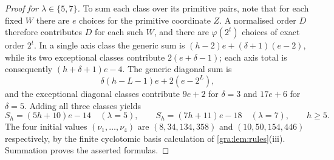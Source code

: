 \begin{proof}[Proof for $\lambda\in\{5,7\}$]
To sum each class over its primitive pairs, note that for each fixed $W$
there are $e$ choices for the primitive coordinate $Z$. A normalised order
$D$ therefore contributes $D$ for each such $W$, and there are
$\varphi(2^t)$ choices of exact order $2^t$. In a single axis class the
generic sum is $(h-2)e+(\delta+1)(e-2)$, while its two exceptional classes
contribute $2(e+\delta-1)$; each axis total is consequently
$(h+\delta+1)e-4$. The generic diagonal sum is
\[
 \delta(h-L-1)e+2(e-2^L),
\]
and the exceptional diagonal classes contribute $9e+2$ for $\delta=3$ and
$17e+6$ for $\delta=5$. Adding all three classes yields
\[
 S_h=(5h+10)e-14\quad(\lambda=5),\qquad
 S_h=(7h+11)e-18\quad(\lambda=7),\qquad h\ge5.
\]
The four initial values $(\nu_1,\dots,\nu_4)$ are $(8,34,134,358)$ and
$(10,50,154,446)$ respectively, by the finite cyclotomic basis calculation
of \cref{gra:lem:rules}(iii). Summation proves the asserted formulas.
\end{proof}

